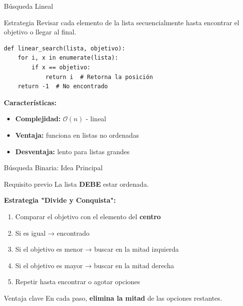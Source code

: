 \documentclass[10pt]{beamer}
\begin{document}
\begin{frame}[fragile]{Búsqueda Lineal}
  \begin{block}{Estrategia}
    Revisar cada elemento de la lista secuencialmente hasta encontrar el objetivo 
    o llegar al final.
  \end{block}

\begin{verbatim}
def linear_search(lista, objetivo):
    for i, x in enumerate(lista):
        if x == objetivo:
            return i  # Retorna la posición
    return -1  # No encontrado
\end{verbatim}

\vspace{0.3cm}
\textbf{Características:}
\begin{itemize}
  \item \textbf{Complejidad:} $\mathcal{O}(n)$ - lineal
  \item \textbf{Ventaja:} funciona en listas no ordenadas
  \item \textbf{Desventaja:} lento para listas grandes
\end{itemize}
\end{frame}

\begin{frame}{Búsqueda Binaria: Idea Principal}
  \begin{block}{Requisito previo}
    La lista \textbf{DEBE} estar ordenada.
  \end{block}
  
  \vspace{0.3cm}
  \textbf{Estrategia "Divide y Conquista":}
  \begin{enumerate}
    \item Comparar el objetivo con el elemento del \textbf{centro}
    \item Si es igual → encontrado
    \item Si el objetivo es menor → buscar en la mitad izquierda
    \item Si el objetivo es mayor → buscar en la mitad derecha
    \item Repetir hasta encontrar o agotar opciones
  \end{enumerate}
  
  \vspace{0.3cm}
  \begin{alertblock}{Ventaja clave}
    En cada paso, \textbf{elimina la mitad} de las opciones restantes.
  \end{alertblock}
\end{frame}
\end{document}
